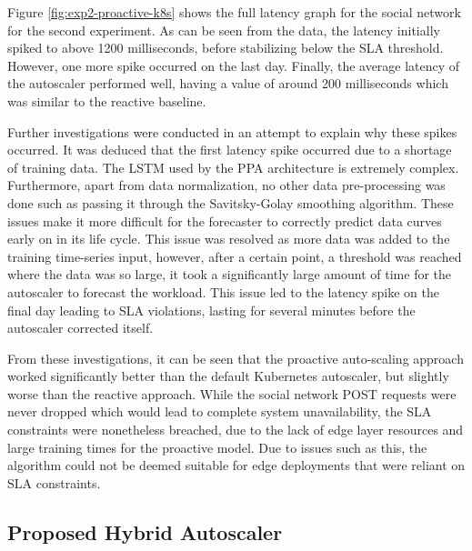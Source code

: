 Figure \ref{fig:exp2-proactive-k8s} shows the full latency graph for the social network for the second experiment. As can be seen from the data, the latency initially spiked to above 1200 milliseconds, before stabilizing below the SLA threshold. However, one more spike occurred on the last day. Finally, the average latency of the autoscaler performed well, having a value of around 200 milliseconds which was similar to the reactive baseline.\par

Further investigations were conducted in an attempt to explain why these spikes occurred. It was deduced that the first latency spike occurred due to a shortage of training data. The LSTM used by the PPA architecture is extremely complex. Furthermore, apart from data normalization, no other data pre-processing was done such as passing it through the Savitsky-Golay smoothing algorithm. These issues make it more difficult for the forecaster to correctly predict data curves early on in its life cycle. This issue was resolved as more data was added to the training time-series input, however, after a certain point, a threshold was reached where the data was so large, it took a significantly large amount of time for the autoscaler to forecast the workload. This issue led to the latency spike on the final day leading to SLA violations, lasting for several minutes before the autoscaler corrected itself.\par

From these investigations, it can be seen that the proactive auto-scaling approach worked significantly better than the default Kubernetes autoscaler, but slightly worse than the reactive approach. While the social network POST requests were never dropped which would lead to complete system unavailability, the SLA constraints were nonetheless breached, due to the lack of edge layer resources and large training times for the proactive model. Due to issues such as this, the algorithm could not be deemed suitable for edge deployments that were reliant on SLA constraints.\par

\subsection {Proposed Hybrid Autoscaler}
\label{subsec:ch6-hybrid-algo}

